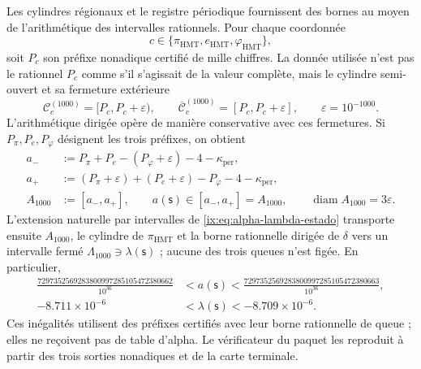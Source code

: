 Les cylindres régionaux et le registre périodique fournissent des bornes au moyen
de l'arithmétique des intervalles rationnels. Pour chaque coordonnée
\[
 c\in\{\pi_{\mathrm{HMT}},e_{\mathrm{HMT}},\varphi_{\mathrm{HMT}}\},
\]
soit \(P_c\) son préfixe nonadique certifié de mille chiffres. La donnée utilisée
n'est pas le rationnel \(P_c\) comme s'il s'agissait de la valeur complète, mais le cylindre
semi-ouvert et sa fermeture extérieure
\[
 \mathcal C_c^{(1000)}=[P_c,P_c+\varepsilon),
 \qquad
 \overline{\mathcal C}_c^{(1000)}=[P_c,P_c+\varepsilon],
 \qquad \varepsilon=10^{-1000}.
\]
L'arithmétique dirigée opère de manière conservative avec ces fermetures. Si
\(P_\pi,P_e,P_\varphi\) désignent les trois préfixes, on obtient
\begin{equation}
\begin{aligned}
 a_-&:=P_\pi+P_e-(P_\varphi+\varepsilon)-4-
       \kappa_{\mathrm{per}},\\
 a_+&:=(P_\pi+\varepsilon)+(P_e+\varepsilon)-P_\varphi-4-
       \kappa_{\mathrm{per}},\\
 A_{1000}&:=[a_-,a_+],
 \qquad a(\mathsf s)\in[a_-,a_+]=A_{1000},
 \qquad \operatorname{diam}A_{1000}=3\varepsilon.
\end{aligned}
\label{ix:eq:alpha-propagacion-colas-rev08}
\end{equation}
L'extension naturelle par intervalles de
\eqref{ix:eq:alpha-lambda-estado} transporte ensuite \(A_{1000}\), le cylindre
de \(\pi_{\mathrm{HMT}}\) et la borne rationnelle dirigée de \(\delta\) vers un
intervalle fermé \(\Lambda_{1000}\ni\lambda(\mathsf s)\) ; aucune
des trois queues n'est figée. En particulier,
\begin{equation}
\begin{aligned}
 \frac{7297352569283800997285105472380662}{10^{36}}
 &<a(\mathsf s)<
 \frac{7297352569283800997285105472380663}{10^{36}},\\
 -8.711\mathbin{\times}10^{-6}
 &<\lambda(\mathsf s)<-8.709\mathbin{\times}10^{-6}.
\end{aligned}
 \label{ix:eq:alpha-cotas-precoordenada-lambda}
\end{equation}
Ces inégalités utilisent des préfixes certifiés avec leur borne rationnelle de
queue ; elles ne reçoivent pas de table d'alpha. Le vérificateur du paquet les reproduit
à partir des trois sorties nonadiques et de la carte terminale.

